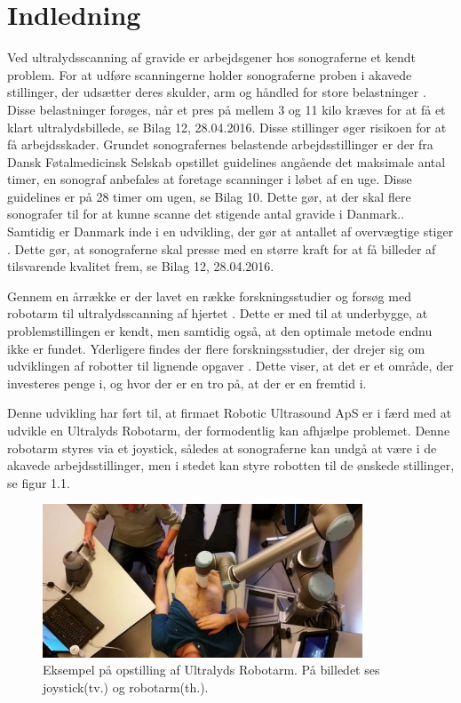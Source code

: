 \chapter{Indledning} 
Ved ultralydsscanning af gravide er arbejdsgener hos sonograferne et kendt problem. For at udføre scanningerne holder sonograferne proben i akavede stillinger, der udsætter deres skulder, arm og håndled for store belastninger \cite{31}\cite{24}\cite{36}\cite{32}. Disse belastninger forøges, når et pres på mellem 3 og 11 kilo kræves for at få et klart ultralydsbillede, se Bilag 12, 28.04.2016. Disse stillinger øger risikoen for at få arbejdsskader. Grundet sonografernes belastende arbejdsstillinger er der fra Dansk Føtalmedicinsk Selskab opstillet guidelines angående det maksimale antal timer, en sonograf anbefales at foretage scanninger i løbet af en uge. Disse guidelines er på 28 timer om ugen, se Bilag 10. Dette gør, at der skal flere sonografer til for at kunne scanne det stigende antal gravide i Danmark.\cite{Foedsler}. \\
Samtidig er Danmark inde i en udvikling, der gør at antallet af overvægtige stiger \cite{Overvaegt}. Dette gør, at sonograferne skal presse med en større kraft for at få billeder af tilsvarende kvalitet frem, se Bilag 12, 28.04.2016. 

Gennem en årrække er der lavet en række forskningsstudier og forsøg med robotarm til ultralydsscanning af hjertet \cite{8}. Dette er med til at underbygge, at problemstillingen er kendt, men samtidig også, at den optimale metode endnu ikke er fundet. Yderligere findes der flere forskningsstudier, der drejer sig om udviklingen af robotter til lignende opgaver \cite{18}\cite{8}. Dette viser, at det er et område, der investeres penge i, og hvor der er en tro på, at der er en fremtid i. 

Denne udvikling har ført til, at firmaet Robotic Ultrasound ApS er i færd med at udvikle en Ultralyds Robotarm, der formodentlig kan afhjælpe problemet. Denne robotarm styres via et joystick, således at sonograferne kan undgå at være i de akavede arbejdsstillinger, men i stedet kan styre robotten til de ønskede stillinger, se figur 1.1.  

\begin{figure}[H]\centering
	\includegraphics[width = 0.85\textwidth]{Figurer/ergonomiskLosning.jpg}
	\caption{Eksempel på opstilling af Ultralyds Robotarm. På billedet ses joystick(tv.) og robotarm(th.).  }
	\label{ergonomiskLosning}
\end{figure}


